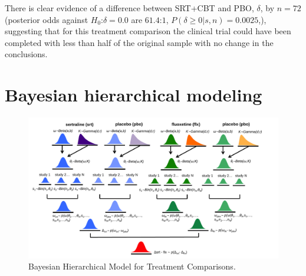 \documentclass{juliacon}
\begin{document}
{There is clear evidence of a difference between SRT+CBT and PBO, $\delta$, by $n=72$ (posterior odds against $H_0$:$\delta=0.0$ are $61.4$:$1$, $P(\delta \ge 0|s,n) = 0.0025$,), suggesting that for this treatment comparison the clinical trial could have been completed with less than half of the original sample with no change in the conclusions.

\section{Bayesian hierarchical modeling}
\label{sec:hbm}

\begin{figure}[t]
	\centerline{\includegraphics[width=18cm]{bhm_model.pdf}}
	\caption{Bayesian Hierarchical Model for Treatment Comparisons.}
	\label{fig:bhm}
\end{figure}

}
\end{document}
